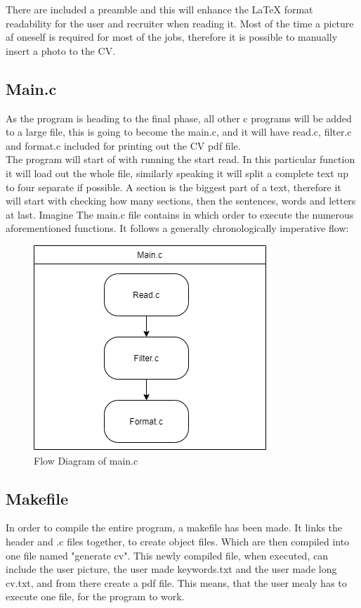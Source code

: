 There are included a preamble and this will enhance the LaTeX format readability for the user and recruiter when reading it. 
Most of the time a picture af oneself is required for most of the jobs, therefore it is possible to manually insert a photo to the CV. 

\subsection{Main.c}
As the program is heading to the final phase, all other c programs will be added to a large file, 
this is going to become the main.c, and it will have read.c, filter.c and format.c included for printing out the CV pdf file. \\

The program will start of with running the start read. In this particular function it will load out the whole file, 
similarly speaking it will split a complete text up to four separate if possible. A section is the biggest part of a text, 
therefore it will start with checking how many sections, then the sentences, words and letters at last. Imagine 
The main.c file contains in which order to execute the numerous aforementioned functions.
It follows a generally chronologically imperative flow:
\begin{figure}[H]
  \centering
  \includegraphics[scale = 0.6]{figures/main.png}
  \caption{Flow Diagram of main.c}
\end{figure}

\subsection{Makefile}
In order to compile the entire program, a makefile has been made. It links the header and .c files together, to create object files. Which are then compiled into one file named "generate cv".
This newly compiled file, when executed, can include the user picture, the user made keywords.txt and the user made long cv.txt, and from there create a pdf file.
This means, that the user mealy has to execute one file, for the program to work.

